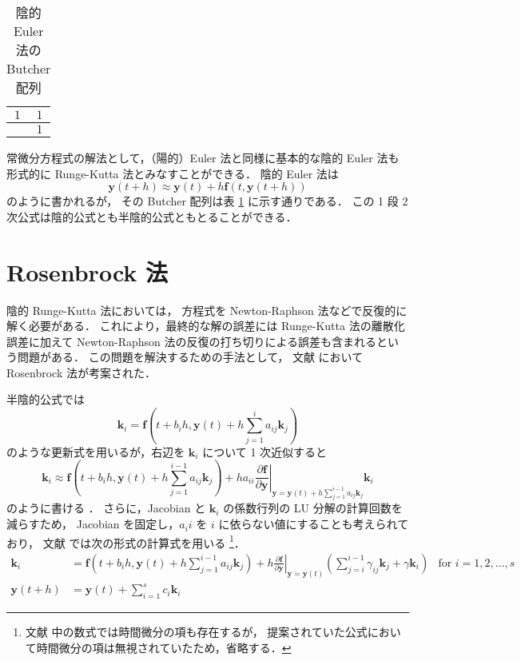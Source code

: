 \begin{table}[bp]
    \caption{陰的 Euler 法の Butcher 配列}
    \label{table:ode_runge-kutta_butcher-array-implicit-euler}
    \centering
    \begin{tabular}{c|c}
        $1$ & $1$ \\
        \hline
            & $1$
    \end{tabular}
\end{table}

常微分方程式の解法として，（陽的）Euler 法と同様に基本的な陰的 Euler 法も
形式的に Runge-Kutta 法とみなすことができる．
陰的 Euler 法は
\begin{equation}
    \bm{y}(t + h) \approx \bm{y}(t) + h \bm{f}(t, \bm{y}(t + h))
\end{equation}
のように書かれるが，
その Butcher 配列は表 \ref{table:ode_runge-kutta_butcher-array-implicit-euler} に示す通りである．
この 1 段 2 次公式は陰的公式とも半陰的公式ともとることができる．

\section{Rosenbrock 法}

陰的 Runge-Kutta 法においては，
方程式を Newton-Raphson 法などで反復的に解く必要がある．
これにより，最終的な解の誤差には Runge-Kutta 法の離散化誤差に加えて
Newton-Raphson 法の反復の打ち切りによる誤差も含まれるという問題がある．
この問題を解決するための手法として，
文献 \cite{Rosenbrock1963} において Rosenbrock 法が考案された．

半陰的公式では
\begin{equation}
    \bm{k}_i = \bm{f}\left(t + b_i h, \bm{y}(t) + h \sum_{j = 1}^i a_{ij} \bm{k}_j \right)
\end{equation}
のような更新式を用いるが，右辺を $\bm{k}_i$ について 1 次近似すると
\begin{equation}
    \bm{k}_i \approx \bm{f}\left(t + b_i h, \bm{y}(t) + h \sum_{j = 1}^{i-1} a_{ij} \bm{k}_j \right)
    + h a_{ii}
    \left. \frac{\partial \bm{f}}{\partial \bm{y}}
    \right|_{\bm{y} = \bm{y}(t) + h \sum_{j = 1}^{i-1} a_{ij} \bm{k}_j}
    \bm{k}_i
\end{equation}
のように書ける \cite{Rosenbrock1963}．
さらに，Jacobian と $\bm{k}_i$ の係数行列の LU 分解の計算回数を減らすため，
Jacobian を固定し，$a_ii$ を $i$ に依らない値にすることも考えられており，
文献 \cite{Rang2005} では次の形式の計算式を用いる
\footnote{文献 \cite{Rang2005} 中の数式では時間微分の項も存在するが，%
    提案されていた公式において時間微分の項は無視されていたため，省略する．}．
\begin{align}
    \bm{k}_i
     & = \bm{f}\left(t + b_i h, \bm{y}(t) + h \sum_{j = 1}^{i - 1} a_{ij} \bm{k}_j \right)
    + h
    \left. \frac{\partial \bm{f}}{\partial \bm{y}} \right|_{\bm{y} = \bm{y}(t)}
    \left( \sum_{j = i}^{i - 1} \gamma_{ij} \bm{k}_j + \gamma \bm{k}_i \right)
     & \text{for $i = 1, 2, \ldots, s$}
    \label{eq:ode_rosenbrock_k-law}                                                        \\
    \bm{y}(t + h)
     & = \bm{y}(t) + \sum_{i=1}^{s} c_i \bm{k}_i
    \label{eq:ode_rosenbrock_y-law}
\end{align}

